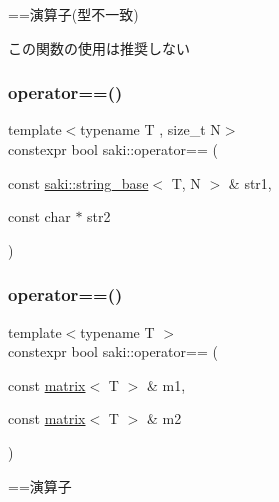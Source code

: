 ==演算子(型不一致) 

この関数の使用は推奨しない \mbox{\label{namespacesaki_a1f5c975d021d701e0360608eb7a872eb}} 
\subsubsection{\texorpdfstring{operator==()}{operator==()}\hspace{0.1cm}{\footnotesize\ttfamily [10/14]}}
{\footnotesize\ttfamily template$<$typename T , size\+\_\+t N$>$ \\
constexpr bool saki\+::operator== (\begin{DoxyParamCaption}\item[{const \mbox{\hyperlink{classsaki_1_1string__base}{saki\+::string\+\_\+base}}$<$ T, N $>$ \&}]{str1,  }\item[{const char $\ast$}]{str2 }\end{DoxyParamCaption})}

\mbox{\label{namespacesaki_a67e5e15cae6e9152e0bd5ac2e1705da4}} 
\subsubsection{\texorpdfstring{operator==()}{operator==()}\hspace{0.1cm}{\footnotesize\ttfamily [11/14]}}
{\footnotesize\ttfamily template$<$typename T $>$ \\
constexpr bool saki\+::operator== (\begin{DoxyParamCaption}\item[{const \mbox{\hyperlink{classsaki_1_1matrix}{matrix}}$<$ T $>$ \&}]{m1,  }\item[{const \mbox{\hyperlink{classsaki_1_1matrix}{matrix}}$<$ T $>$ \&}]{m2 }\end{DoxyParamCaption})}



==演算子 

\mbox{\label{namespacesaki_a1ffbf8122dda5209dc384e64747bec32}} 
